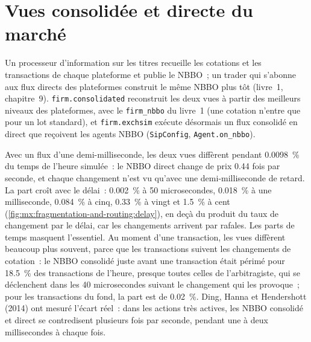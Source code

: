 \section{Vues consolidée et directe du marché}

Un processeur d'information sur les titres recueille les cotations et les transactions de chaque plateforme et publie le NBBO~; un trader qui s'abonne aux flux directs des plateformes construit le même NBBO
plus tôt (livre~1, chapitre~9). \texttt{firm.consolidated} reconstruit les deux vues à partir des meilleurs niveaux des plateformes, avec le
\texttt{firm\_nbbo} du livre~1 (une cotation n'entre que pour un lot standard), et \texttt{firm.exchsim} exécute désormais un flux consolidé en direct que reçoivent les agents NBBO
(\texttt{SipConfig}, \texttt{Agent.on\_nbbo}).

Avec un flux d'une demi-milliseconde, les deux vues diffèrent pendant 0.0098~\% du temps de l'heure simulée~: le NBBO direct change de prix 0.44 fois par seconde, et
chaque changement n'est vu qu'avec une demi-milliseconde de retard. La part croît avec le délai~: 0.002~\% à 50 microsecondes, 0.018~\% à une milliseconde, 0.084~\% à cinq,
0.33~\% à vingt et 1.5~\% à cent (\cref{fig:mx:fragmentation-and-routing:delay}), en deçà du produit du taux de changement par le délai, car les changements arrivent par rafales. Les parts de temps masquent l'essentiel.
Au moment d'une transaction, les vues diffèrent beaucoup plus souvent, parce que les transactions suivent les changements de cotation~:
le NBBO consolidé juste avant une transaction était périmé pour 18.5~\% des transactions de l'heure, presque toutes celles de l'arbitragiste, qui se déclenchent dans les 40
microsecondes suivant le changement qui les provoque~; pour les transactions du fond, la part est de 0.02~\%. Ding, Hanna et Hendershott (2014) ont mesuré l'écart réel~:
dans les actions très actives, les NBBO consolidé et direct se contredisent plusieurs fois par seconde, pendant une à deux millisecondes à chaque fois.


